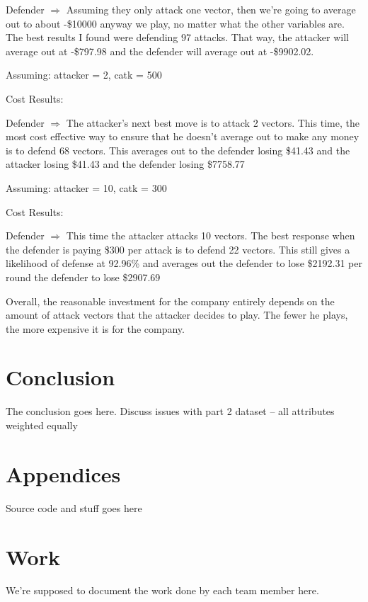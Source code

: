 \documentclass[11pt,journal]{IEEEtran}
\begin{document}
Defender $\Rightarrow$ Assuming they only attack one vector, then we're going to average out to about -\$10000 anyway we play, no matter what the other variables are. The best results I found were defending 97 attacks. That way, the attacker will average out at -\$797.98 and the defender will average out at -\$9902.02.
\par
Assuming:
attacker = 2,
catk = 500
\par
Cost Results: 

Defender $\Rightarrow$ The attacker's next best move is to attack 2 vectors. This time, the most cost effective way to ensure that he doesn't average out to make any money is to defend 68 vectors. This averages out to the defender losing \$41.43 and the attacker losing \$41.43 and the defender losing \$7758.77
\par
Assuming:
attacker = 10,
catk = 300
\par
Cost Results: 

Defender $\Rightarrow$ This time the attacker attacks 10 vectors. The best response when the defender is paying \$300 per attack is to defend 22 vectors. This still gives a likelihood of defense at 92.96\% and averages out the defender to lose \$2192.31 per round the defender to lose \$2907.69
\par
Overall, the reasonable investment for the company entirely depends on the amount of attack vectors that the attacker decides to play. The fewer he plays, the more expensive it is for the company.



\section{Conclusion} \label{conclusion}
The conclusion goes here.
Discuss issues with part 2 dataset -- all attributes weighted equally




\section*{Appendices}

Source code and stuff goes here


\section*{Work}
We're supposed to document the work done by each team member here.




\end{document}
